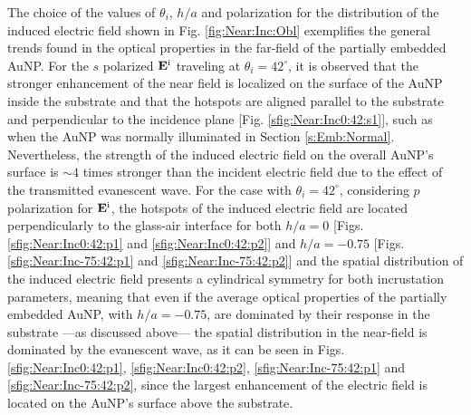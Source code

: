 The choice of the values of $\theta_i$, $h/a$ and polarization for the distribution of the induced electric field shown in Fig. \ref{fig:Near:Inc:Obl} exemplifies the general trends found in the optical properties in the far-field of the partially  embedded AuNP. For the $s$ polarized $\vb{E}^\text{i}$ traveling at $\theta_i = 42^\circ$, it is observed that the stronger enhancement of the near field is localized on the surface of the AuNP inside the substrate and that the hotspots are aligned parallel to the substrate and perpendicular to the incidence plane [Fig. \ref{sfig:Near:Inc0:42:s1}], such as when the AuNP was normally illuminated in Section \ref{s:Emb:Normal}. Nevertheless, the strength of the induced electric field on the overall AuNP's surface is $\sim 4$ times stronger than the incident electric field due to the effect of the transmitted evanescent wave.  For the case with $\theta_i = 42^\circ $, considering $p$ polarization for $\vb{E}^\text{i}$, the hotspots of the induced electric field are located  perpendicularly to the glass-air interface for both $h/a= 0$ [Figs. \ref{sfig:Near:Inc0:42:p1} and \ref{sfig:Near:Inc0:42:p2}] and $h/a = -0.75$ [Figs. \ref{sfig:Near:Inc-75:42:p1} and \ref{sfig:Near:Inc-75:42:p2}] and the spatial distribution of the induced electric field presents a cylindrical symmetry for both incrustation parameters, meaning that even if the average optical properties of the partially embedded AuNP, with $h/a = -0.75$,  are dominated by their response in the substrate ---as discussed above--- the spatial distribution in the near-field is dominated by the evanescent wave, as it can be seen in Figs. \ref{sfig:Near:Inc0:42:p1},  \ref{sfig:Near:Inc0:42:p2}, \ref{sfig:Near:Inc-75:42:p1} and \ref{sfig:Near:Inc-75:42:p2}, since the largest enhancement of the electric field is located on the AuNP's surface above the substrate.

